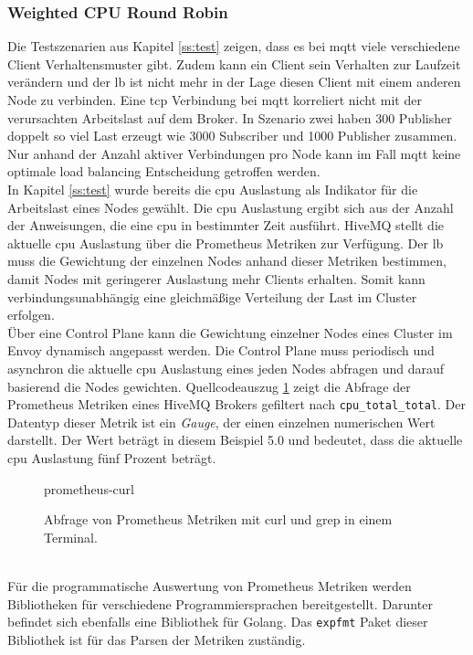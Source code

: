 \subsubsection{Weighted CPU Round Robin} \label{ss:weighted-cpu}
Die Testszenarien aus Kapitel \ref{ss:test} zeigen, dass es bei \ac{mqtt} viele verschiedene Client Verhaltensmuster gibt. Zudem kann ein Client sein Verhalten zur Laufzeit verändern und der \acl{lb} ist nicht mehr in der Lage diesen Client mit einem anderen Node zu verbinden.
Eine \ac{tcp} Verbindung bei \ac{mqtt} korreliert nicht mit der verursachten Arbeitslast auf dem Broker. In Szenario zwei haben 300 Publisher doppelt so viel Last erzeugt wie 3000 Subscriber und 1000 Publisher zusammen.
Nur anhand der Anzahl aktiver Verbindungen pro Node kann im Fall \ac{mqtt} keine optimale load balancing Entscheidung getroffen werden.
\\
In Kapitel \ref{ss:test} wurde bereits die \ac{cpu} Auslastung als Indikator für die Arbeitslast eines Nodes gewählt. Die \ac{cpu} Auslastung ergibt sich aus der Anzahl der Anweisungen, die eine \ac{cpu} in bestimmter Zeit ausführt.
HiveMQ stellt die aktuelle \ac{cpu} Auslastung über die Prometheus Metriken zur Verfügung. Der \acl{lb} muss die Gewichtung der einzelnen Nodes anhand dieser Metriken bestimmen, damit Nodes mit geringerer Auslastung mehr Clients erhalten. Somit kann verbindungsunabhängig eine gleichmä{\ss}ige Verteilung der Last im Cluster erfolgen.
\\
Über eine Control Plane kann die Gewichtung einzelner Nodes eines Cluster im Envoy dynamisch angepasst werden.
Die Control Plane muss periodisch und asynchron die aktuelle \ac{cpu} Auslastung eines jeden Nodes abfragen und darauf basierend die Nodes gewichten.
Quellcodeauszug \ref{code:prometheus-curl} zeigt die Abfrage der Prometheus Metriken eines HiveMQ Brokers gefiltert nach \verb|cpu_total_total|. Der Datentyp dieser Metrik ist ein \textit{Gauge}, der einen einzelnen numerischen Wert darstellt.\cite{prometheusMetricTypesPrometheus} Der Wert beträgt in diesem Beispiel 5.0 und bedeutet, dass die aktuelle \ac{cpu} Auslastung fünf Prozent beträgt.
\begin{figure}
    {prometheus-curl}
    \caption{Abfrage von Prometheus Metriken mit curl und grep in einem Terminal.}
    \label{code:prometheus-curl}
\end{figure}
\\
Für die programmatische Auswertung von Prometheus Metriken werden Bibliotheken für verschiedene Programmiersprachen bereitgestellt. Darunter befindet sich ebenfalls eine Bibliothek für Golang. Das \verb|expfmt| Paket dieser Bibliothek ist für das Parsen der Metriken zuständig.\cite{ExpfmtPkgGo}
